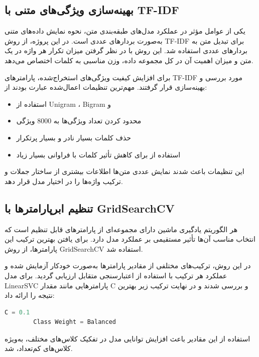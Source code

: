 \subsection{بهینه‌سازی ویژگی‌های متنی با TF-IDF}
یکی از عوامل مؤثر در عملکرد مدل‌های طبقه‌بندی متن، نحوه نمایش داده‌های متنی به‌صورت بردارهای عددی است. در این پروژه، از روش TF-IDF  برای تبدیل متن به بردارهای عددی استفاده شد. این روش با در نظر گرفتن میزان تکرار هر واژه در یک متن و میزان اهمیت آن در کل مجموعه داده، وزن مناسبی به کلمات اختصاص می‌دهد.

برای افزایش کیفیت ویژگی‌های استخراج‌شده، پارامترهای TF-IDF مورد بررسی و بهینه‌سازی قرار گرفتند. مهم‌ترین تنظیمات اعمال‌شده عبارت بودند از:

\begin{itemize}
	\item استفاده از Unigram ، Bigram و 
	\item محدود کردن تعداد ویژگی‌ها به 8000 ویژگی
	\item حذف کلمات بسیار نادر و بسیار پرتکرار
	\item استفاده از  برای کاهش تأثیر کلمات با فراوانی بسیار زیاد
\end{itemize}
 




این تنظیمات باعث شدند نمایش عددی متن‌ها اطلاعات بیشتری از ساختار جملات و ترکیب واژه‌ها را در اختیار مدل قرار دهد.
\subsection{تنظیم ابرپارامترها با GridSearchCV}
هر الگوریتم یادگیری ماشین دارای مجموعه‌ای از پارامترهای قابل تنظیم است که انتخاب مناسب آن‌ها تأثیر مستقیمی بر عملکرد مدل دارد. برای یافتن بهترین ترکیب این پارامترها، از روش GridSearchCV استفاده شد.

در این روش، ترکیب‌های مختلفی از مقادیر پارامترها به‌صورت خودکار آزمایش شده و عملکرد هر ترکیب با استفاده از اعتبارسنجی متقابل  ارزیابی گردید. برای مدل LinearSVC  پارامترهایی مانند مقدار C و  بررسی شدند و در نهایت ترکیب زیر بهترین نتیجه را ارائه داد:
\begin{latin}
	\begin{lstlisting}[language=Python]
		C = 0.1
		Class Weight = Balanced
	\end{lstlisting}
\end{latin}

استفاده از این مقادیر باعث افزایش توانایی مدل در تفکیک کلاس‌های مختلف، به‌ویژه کلاس‌های کم‌تعداد، شد.
